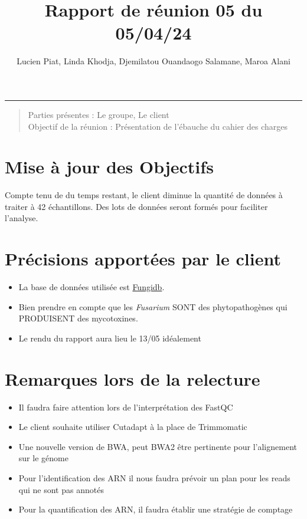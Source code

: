 \documentclass[a4paper, 11pt]{article}
\title{Rapport de réunion 05 du 05/04/24}
\author{Lucien Piat, Linda Khodja, Djemilatou Ouandaogo Salamane, Maroa Alani}
\begin{document}
\maketitle
\noindent\rule{8cm}{0.4pt}
\begin{quote}
    Parties présentes : Le groupe, Le client\\
    Objectif de la réunion : Présentation de l'ébauche du cahier des charges
\end{quote}

\section{Mise à jour des Objectifs}
Compte tenu de du temps restant, le client diminue la quantité de données à traiter à 42 échantillons. 
Des lots de données seront formés pour faciliter l'analyse.\\ 

\section{Précisions apportées par le client}
\begin{itemize}[itemsep=1pt]
    \item La base de données utilisée est \href{https://fungidb.org/fungidb/app}{Fungidb}.  
    \item Bien prendre en compte que les \textit{Fusarium} SONT des phytopathogènes qui PRODUISENT des mycotoxines. 
    \item Le rendu du rapport aura lieu le 13/05 idéalement
\end{itemize}

\section{Remarques lors de la relecture}
\begin{itemize}[itemsep=1pt]
    \item Il faudra faire attention lors de l'interprétation des FastQC
    \item Le client souhaite utiliser  Cutadapt à la place de Trimmomatic
    \item Une nouvelle version de BWA, peut BWA2 être pertinente pour l'alignement sur le génome
    \item Pour l'identification des ARN il nous faudra prévoir un plan pour les reads qui ne sont pas annotés
    \item Pour la quantification des ARN, il faudra établir une stratégie de comptage
\end{itemize}
\end{document}
